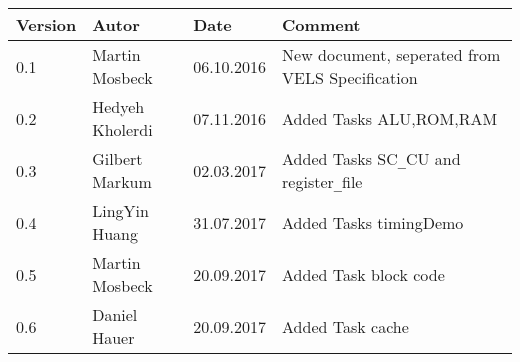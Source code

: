 
\begin{table}[h]
\begin{tabular*}{14.7cm}{|p{}|p{}|p{2cm}|p{}|}
\hline 
Version & Autor & Date & Comment \\[2pt]
\hline
\hline
0.1 & Martin Mosbeck & 06.10.2016& New document, seperated from VELS Specification \\[2pt]
\hline
0.2 & Hedyeh Kholerdi & 07.11.2016& Added Tasks ALU,ROM,RAM \\[2pt]
\hline
0.3 & Gilbert Markum & 02.03.2017 & Added Tasks SC\verb!_!CU and register\verb!_!file \\[2pt]
\hline
0.4 & LingYin Huang & 31.07.2017 & Added Tasks timingDemo \\ [2pt]
\hline
0.5 & Martin Mosbeck & 20.09.2017 & Added Task block code \\ [2pt]
\hline
0.6 & Daniel Hauer & 20.09.2017 & Added Task cache \\ [2pt]
\hline
\end{tabular*}
\end{table}


